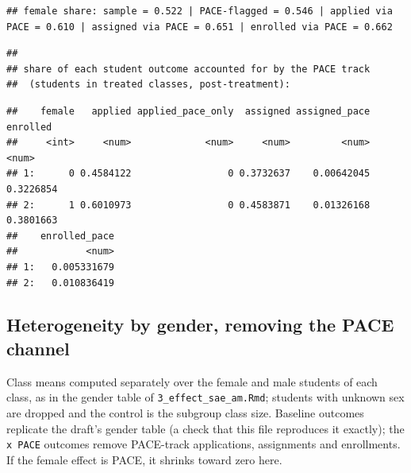 \documentclass[
]{article}
\begin{document}
\begin{verbatim}
## female share: sample = 0.522 | PACE-flagged = 0.546 | applied via PACE = 0.610 | assigned via PACE = 0.651 | enrolled via PACE = 0.662
\end{verbatim}

\begin{verbatim}
## 
## share of each student outcome accounted for by the PACE track
##  (students in treated classes, post-treatment):
\end{verbatim}

\begin{verbatim}
##    female   applied applied_pace_only  assigned assigned_pace  enrolled
##     <int>     <num>             <num>     <num>         <num>     <num>
## 1:      0 0.4584122                 0 0.3732637    0.00642045 0.3226854
## 2:      1 0.6010973                 0 0.4583871    0.01326168 0.3801663
##    enrolled_pace
##            <num>
## 1:   0.005331679
## 2:   0.010836419
\end{verbatim}

\hypertarget{heterogeneity-by-gender-removing-the-pace-channel}{%
\subsection{Heterogeneity by gender, removing the PACE
channel}\label{heterogeneity-by-gender-removing-the-pace-channel}}

Class means computed separately over the female and male students of
each class, as in the gender table of \texttt{3\_effect\_sae\_am.Rmd};
students with unknown sex are dropped and the control is the subgroup
class size. Baseline outcomes replicate the draft's gender table (a
check that this file reproduces it exactly); the \texttt{x\ PACE}
outcomes remove PACE-track applications, assignments and enrollments. If
the female effect is PACE, it shrinks toward zero here.

\begin{table}[htbp]
   \caption{Regression Results by Gender, Excluding the PACE Channel}\label{tab: results by gender excl pace}
   \centerline{}
\end{table}
\end{document}
